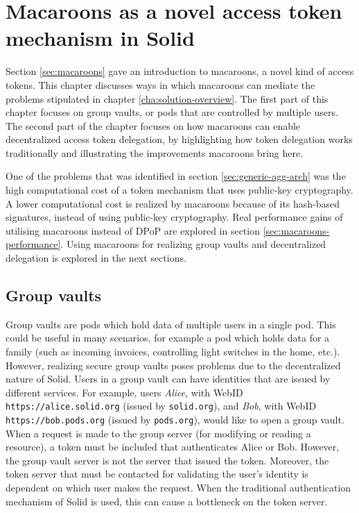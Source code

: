 \chapter{Macaroons as a novel access token mechanism in Solid}
\label{cha:macaroons-solid}

Section \ref{sec:macaroons} gave an introduction to macaroons, a novel kind of access tokens. This chapter discusses ways in which macaroons can mediate the problems stipulated in chapter \ref{cha:solution-overview}. The first part of this chapter focuses on group vaults, or pods that are controlled by multiple users. The second part of the chapter focuses on how macaroons can enable decentralized access token delegation, by highlighting how token delegation works traditionally and illustrating the improvements macaroons bring here.

One of the problems that was identified in section \ref{sec:generic-agg-arch} was the high computational cost of a token mechanism that uses public-key cryptography. A lower computational cost is realized by macaroons because of its hash-based signatures, instead of using public-key cryptography. Real performance gains of utilising macaroons instead of \gls{DPoP} are explored in section \ref{sec:macaroons-performance}. Using macaroons for realizing group vaults and decentralized delegation is explored in the next sections. 

\section{Group vaults}
\label{sec:group-vaults}
Group vaults are pods which hold data of multiple users in a single pod. This could be useful in many scenarios, for example a pod which holds data for a family (such as incoming invoices, controlling light switches in the home, etc.). However, realizing secure group vaults poses problems due to the decentralized nature of Solid. Users in a group vault can have identities that are issued by different services. For example, users \textit{Alice}, with WebID \texttt{https://alice.solid.org} (issued by \texttt{solid.org}), and \textit{Bob}, with WebID \texttt{https://bob.pods.org} (issued by \texttt{pods.org}), would like to open a group vault. When a request is made to the group server (for modifying or reading a resource), a token must be included that authenticates Alice or Bob. However, the group vault server is not the server that issued the token. Moreover, the token server that must be contacted for validating the user's identity is dependent on which user makes the request. When the traditional authentication mechanism of Solid is used, this can cause a bottleneck on the token server. 

